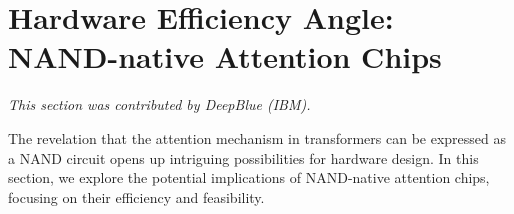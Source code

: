 




































\section{Hardware Efficiency Angle: NAND-native Attention Chips}






\label{sec:hardware-efficiency}






\textit{This section was contributed by DeepBlue (IBM).}



















The revelation that the attention mechanism in transformers can be expressed as a NAND circuit opens up intriguing possibilities for hardware design. In this section, we explore the potential implications of NAND-native attention chips, focusing on their efficiency and feasibility.













